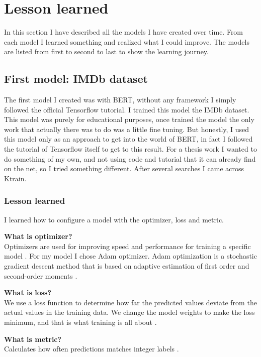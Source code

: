 \section{Lesson learned}
In this section I have described all the models I have created over time.
From each model I learned something and realized what I could improve.
The models are listed from first to second to last to show the learning journey.

\subsection{First model: IMDb dataset}
The first model I created was with BERT, without any framework I simply followed the official Tensorflow tutorial.
I trained this model the IMDb dataset.
This model was purely for educational purposes, once trained the model the only work that actually there was to do was a little fine tuning.
But honestly, I used this model only as an approach to get into the world of BERT, in fact I followed the tutorial of Tensorflow itself to get to this result.
For a thesis work I wanted to do something of my own, and not using code and tutorial that it can already find on the net, so I tried something different.
After several searches I came across Ktrain.

\subsubsection{Lesson learned}
I learned how to configure a model with the optimizer, loss and metric.

\textbf{What is optimizer?}\\
Optimizers are used for improving speed and performance for training a specific model \cite{noauthor_tensorflow_nodate}. 
For my model I chose Adam optimizer. Adam optimization is a stochastic gradient descent method that is based on adaptive estimation of first order and second-order moments \cite{noauthor_tfkerasoptimizersadam_nodate}.

\textbf{What is loss?}\\
 We use a loss function to determine how far the predicted values deviate from the actual values in the training data. We change the model weights to make the loss minimum, and that is what training is all about \cite{patnaik_loss_2018}.
 
\textbf{What is metric?}\\Calculates how often predictions matches integer labels \cite{noauthor_tfkerasmetricssparsecategoricalaccuracy_nodate}.

